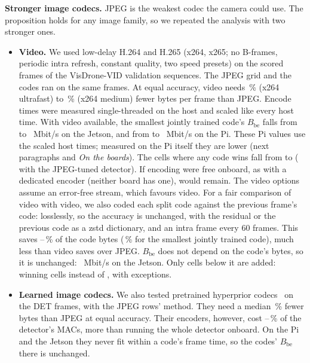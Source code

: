 \textbf{Stronger image codecs.} JPEG is the weakest codec the camera could use. The proposition holds for any image
family, so we repeated the analysis with two stronger ones.
\begin{itemize}
\item \textbf{Video.} We used low-delay H.264 and H.265 (x264, x265; no B-frames, periodic intra refresh,
constant quality, two speed presets) on the \VcFrames{} scored frames of the \VcSeqs{} VisDrone-VID validation
sequences. The JPEG grid and the codes ran on the same frames. At equal accuracy, video needs
\VcSaveHtfUltra\,\% (x264 ultrafast) to \VcSaveHtfMedium\,\% (x264 medium) fewer bytes per frame than JPEG. Encode
times were measured single-threaded on the host and scaled like every host time. With video available, the smallest
jointly trained code's $B_{\mathrm{be}}$ falls from \VcJpegJointFastBe{} to \VcVideoJointFastBe~Mbit/s on the Jetson,
and from \VcJpegJointPiBe{} to \VcVideoJointPiBe~Mbit/s on the Pi. These Pi values use the scaled host times; measured
on the Pi itself they are lower (next paragraphs and \emph{On the boards}). The cells where any code wins fall from
\VcJpegWins{} to \VcBothWins{} (\VcBothTunedWins{} with the JPEG-tuned detector). If encoding were free onboard, as
with a dedicated encoder (neither board has one), \VcBothFreeWins{} would remain. The video options assume an
error-free stream, which favours video. For a fair comparison of video with video, we also coded each split code
against the previous frame's code: losslessly, so the accuracy is unchanged, with the residual or the previous code as
a zstd dictionary, and an intra frame every 60 frames. This saves \ViSaveMin--\ViSaveMax\,\% of the code bytes
(\ViJointSave\,\% for the smallest jointly trained code), much less than video saves over JPEG. $B_{\mathrm{be}}$
does not depend on the code's bytes, so it is unchanged: \ViBothJointFastBe~Mbit/s on the Jetson. Only cells below it
are added: \ViBothWins{} winning cells instead of \VcBothWins{}, with \ViBothExc{} exceptions.
\item \textbf{Learned image codecs.} We also tested pretrained hyperprior codecs~\cite{balle2018variational,minnen2018joint}
on the DET frames, with the JPEG rows' method. They need a median \LicSaveMedian\,\% fewer bytes than JPEG at equal
accuracy. Their encoders, however, cost \LicEncFracMin--\LicEncFracMax\,\% of the detector's MACs, more than running
the whole detector onboard. On the Pi and the Jetson they never fit within a code's frame time, so the codes'
$B_{\mathrm{be}}$ there is unchanged.

\end{itemize}
